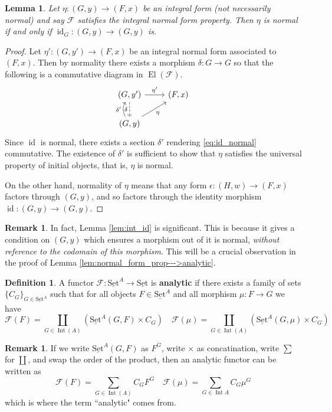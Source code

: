 \documentclass[12pt]{article}
\theoremstyle{plain}
\newtheorem{lemma}[thm]{Lemma}
\theoremstyle{definition}
\newtheorem{defn}[thm]{Definition} %
\newtheorem{remark}[thm]{Remark}
\newcommand{\scr}[1]{\mathscr{#1}}
\newcommand{\lto}{\longrightarrow}
\newcommand{\set}{\operatorname{\underline{Set}}}
\begin{document}
	\begin{lemma}\label{lem:int_id}
		Let $\eta: (G,y) \lto (F,x)$ be an integral form (not necessarily normal) and say $\scr{F}$ satisfies the integral normal form property. Then $\eta$ is normal if and only if $\operatorname{id}_G: (G, y) \lto (G,y)$ is.
	\end{lemma}
	\begin{proof}
		Let $\eta': (G, y') \lto (F,x)$ be an integral normal form associated to $(F,x)$. Then by normality there exists a morphism $\delta: G \lto G$ so that the following is a commutative diagram in $\operatorname{El}(\scr{F})$.
		\begin{equation}\label{eq:id_normal}
			\begin{tikzcd}
				(G, y')\arrow[d,dashed,swap,"{\delta}"]\arrow[r,"{\eta'}"] & (F,x)\\
				(G,y)\arrow[ur,swap,"{\eta}"]\arrow[u,bend left, "{\delta'}"]
				\end{tikzcd}
			\end{equation}
		Since $\operatorname{id}$ is normal, there exists a section $\delta'$ rendering \eqref{eq:id_normal} commutative. The existence of $\delta'$ is sufficient to show that $\eta$ satisfies the universal property of initial objects, that is, $\eta$ is normal.
		
		On the other hand, normality of $\eta$ means that any form $\epsilon: (H,w) \lto (F,x)$ factors through $(G,y)$, and so factors through the identity morphism $\operatorname{id}: (G,y) \lto (G,y)$.
	\end{proof}
\begin{remark}
	In fact, Lemma \eqref{lem:int_id} is significant. This is because it gives a condition on $(G,y)$ which ensures a morphism out of it is normal, \emph{without reference to the codomain of this morphism}. This will be a crucial  observation in the proof of Lemma \ref{lem:normal_form_prop--->analytic}.
	\end{remark}
	\begin{defn}
		A functor $\scr{F}: \set^A \lto \set$ is \textbf{analytic} if there exists a family of sets $\lbrace C_{G}\rbrace_{G \in \set^A}$ such that for all objects $F \in \set^A$ and all morphism $\mu: F \lto G$ we have
		\begin{equation}
			\scr{F}(F) = \coprod_{G \in \operatorname{Int}(A)}(\set^A(G,F) \times C_G)\quad \scr{F}(\mu) = \coprod_{G \in \operatorname{Int}(A)}(\set^A(G,\mu) \times C_G)
			\end{equation}
		\end{defn}
	\begin{remark}
		If we write $\set^A(G,F)$ as $F^G$, write $\times$ as concatination, write $\sum$ for $\coprod$, and swap the order of the product, then an analytic functor can be written as
		\begin{equation}
			\scr{F}(F) = \sum_{G \in \operatorname{Int}(A)}C_G F^G\quad \scr{F}(\mu) = \sum_{G \in \operatorname{Int}A}C_G \mu^G
			\end{equation}
		which is where the term ``analytic" comes from.
		\end{remark}
	
\end{document}
